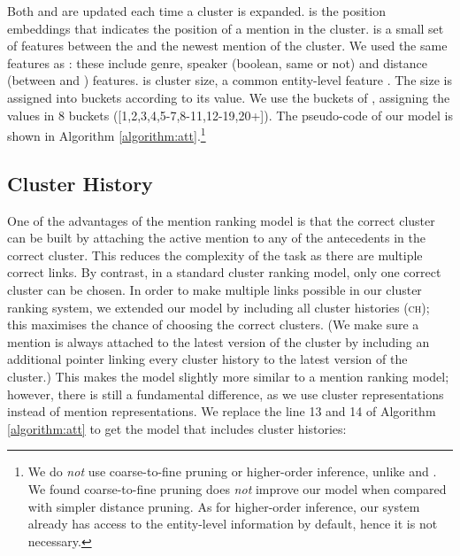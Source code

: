 \documentclass[10pt, a4paper]{article}
\newcommand{\ACRO}[1]{\textsc{#1}}
\begin{document}
Both  and  are updated each time a cluster is expanded. 
 is the position embeddings that indicates the position of a mention in the cluster.  is a small set of features between the  and the newest mention  of the cluster. 
We used the same features as :
these include genre, speaker (boolean, same or not) and distance (between  and ) features.  is cluster size, 
a common entity-level feature \cite{bjorkelund2014learning}. 
The size is assigned into buckets according to its value. We use the buckets of , assigning the values in 8 buckets ([1,2,3,4,5-7,8-11,12-19,20+]).
The pseudo-code of our model is shown in Algorithm \ref{algorithm:att}.\footnote{We do \textit{not} use  coarse-to-fine pruning or higher-order inference, unlike  and .  
We found coarse-to-fine pruning  does \textit{not} improve our model when compared with simpler distance pruning. 
As for higher-order inference, our system  already has access to the entity-level information by default, hence it is not necessary.} 


\subsection{Cluster History}

One of the advantages of the mention ranking model is that the correct cluster can be built by attaching the active mention to any of the antecedents in the correct cluster. 
This reduces the complexity of the task as there are multiple correct links. 
By contrast, in a standard cluster ranking model, only one correct cluster can be chosen. 
In order to make 
multiple links possible in our
cluster ranking system, we extended our
model by including all cluster histories (\ACRO{ch});
this maximises the chance of choosing 
the correct clusters.  
(We make sure a mention is always attached to the latest version of the cluster by including
an additional pointer linking  
every cluster history 
to the latest version of the cluster.)
This makes the model slightly more similar to a mention ranking model; 
however, there is still a fundamental difference, as we use  cluster representations instead of  mention representations.
We replace the line 13 and 14 of Algorithm \ref{algorithm:att} 
to get the model 
that includes  cluster histories:


\vspace{-10pt}
\small


\normalsize
\end{document}
